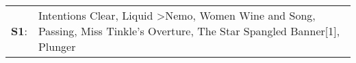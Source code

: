 \begin{supertabular}{p{0.03\textwidth}p{0.92\textwidth}}
 \textbf{S1}:  &  Intentions Clear\textsuperscript{}, \enspace Liquid\textsuperscript{} \textgreater \enspace Nemo\textsuperscript{}, \enspace Women Wine and Song\textsuperscript{}, \enspace Passing\textsuperscript{}, \enspace Miss Tinkle's Overture\textsuperscript{}, \enspace The Star Spangled Banner[1]\textsuperscript{}, \enspace Plunger\textsuperscript{}  \enspace  \\
\end{supertabular}
